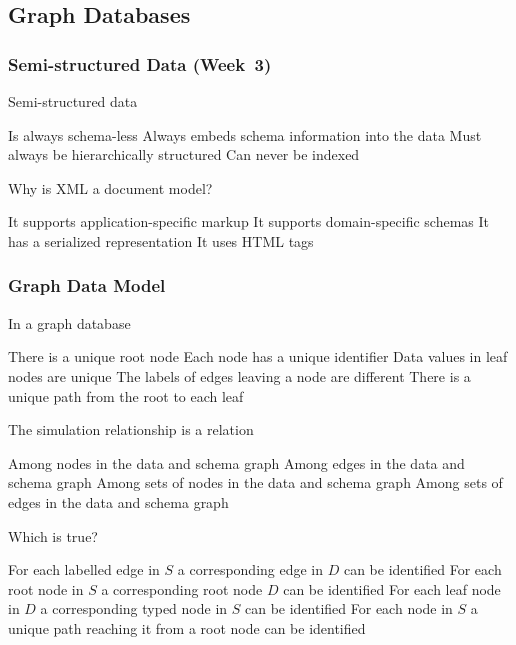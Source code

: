 \documentclass[12pt,a4paper,answers]{exam} %
\begin{document}
\begin{flushleft}
\begin{multicols*}{2}
\begin{questions}
\subsection{Graph Databases} %
\subsubsection{Semi-structured Data (Week~3)}

\question Semi-structured data
\begin{checkboxes}
\choice Is always schema-less
\CorrectChoice Always embeds schema information into the data
\choice Must always be hierarchically structured
\choice Can never be indexed
\end{checkboxes}

\question Why is XML a document model?
\begin{checkboxes}
\choice It supports application-specific markup
\choice It supports domain-specific schemas
\CorrectChoice It has a serialized representation
\choice It uses HTML tags
\end{checkboxes}


\subsubsection{Graph Data Model}

\question In a graph database
\begin{checkboxes}
\choice There is a unique root node
\CorrectChoice Each node has a unique identifier
\choice Data values in leaf nodes are unique
\choice The labels of edges leaving a node are different
\choice There is a unique path from the root to each leaf
\end{checkboxes}

\question The simulation relationship is a relation
\begin{checkboxes}
\CorrectChoice Among nodes in the data and schema graph
\choice Among edges in the data and schema graph
\choice Among sets of nodes in the data and schema graph
\choice Among sets of edges in the data and schema graph
\end{checkboxes}

\question Which is true?
\begin{checkboxes}
\choice For each labelled edge in $S$ a corresponding edge in $D$ can be identified
\choice For each root node in $S$ a corresponding root node $D$ can be identified
\CorrectChoice For each leaf node in $D$ a corresponding typed node in $S$ can be identified
\choice For each node in $S$ a unique path reaching it from a root node can be identified
\end{checkboxes}


\end{questions}
\end{multicols*}
\end{flushleft}
\end{document}
